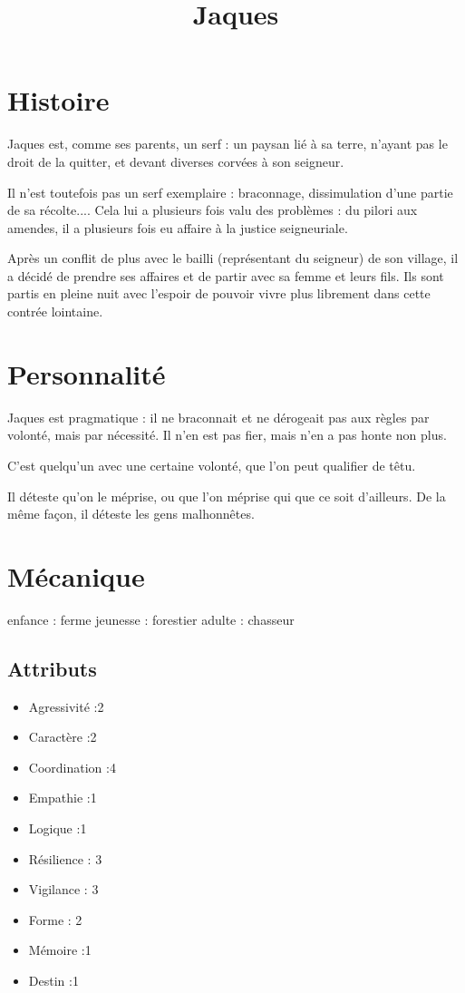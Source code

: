 \documentclass[10pt,a4paper]{article}
\title{Jaques}
\date{}
\begin{document}
\maketitle
\section{Histoire}
Jaques est, comme ses parents, un serf : un paysan lié à sa terre, n'ayant pas le droit de la quitter, et devant diverses corvées à son seigneur.

Il n'est toutefois pas un serf exemplaire : braconnage, dissimulation d'une partie de sa récolte.... Cela lui a plusieurs fois valu des problèmes : du pilori aux amendes, il a plusieurs fois eu affaire à la justice seigneuriale.

Après un conflit de plus avec le bailli (représentant du seigneur) de son village, il a décidé de prendre ses affaires et de partir avec sa femme et leurs fils. Ils sont partis en pleine nuit avec l'espoir de pouvoir vivre plus librement dans cette contrée lointaine.
\section{Personnalité}
Jaques est pragmatique : il ne braconnait et ne dérogeait pas aux règles par volonté, mais par nécessité. Il n'en est pas fier, mais n'en a pas honte non plus.

C'est quelqu'un avec une certaine volonté, que l'on peut qualifier de têtu.

Il déteste qu'on le méprise, ou que l'on méprise qui que ce soit d'ailleurs. De la même façon, il déteste les gens malhonnêtes.
\section{Mécanique}
enfance : ferme
jeunesse : forestier
adulte : chasseur
\subsection{Attributs}
\begin{itemize}
\item Agressivité :2
\item Caractère :2
\item Coordination :4
\item Empathie :1
\item Logique :1
\item Résilience : 3
\item Vigilance : 3
\item Forme : 2
\item Mémoire :1
\item Destin :1
\end{itemize}
\end{document}
